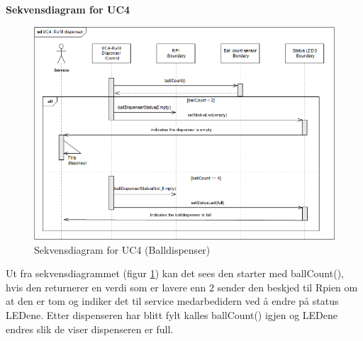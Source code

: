 \documentclass[Rapport/Rapport_main.tex]{subfiles}
\begin{document}
\textbf{Sekvensdiagram for UC4}\\
\begin{figure}[H]
    \centering
    \includegraphics[width=\textwidth]{Arkitektur/Softwarearkitektur/Applikationsmodel/BallDispenser/graphicsBallDispenser/sdUC4.png}
    \caption{Sekvensdiagram for UC4 (Balldispenser)}
    \label{fig:BallDispScUC4}
\end{figure}

Ut fra sekvensdiagrammet (figur \ref{fig:BallDispScUC4}) kan det sees den starter med ballCount(), hvis den returnerer en verdi som er lavere enn 2 sender den beskjed til Rpien om at den er tom og indiker det til service medarbedidern ved å endre på status LEDene. Etter dispenseren har blitt fylt kalles ballCount() igjen og LEDene endres slik de viser dispenseren er full.
\end{document}

